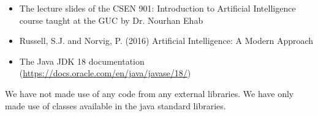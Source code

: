 \documentclass{article}
\begin{document}
\begin{itemize}

\item The lecture slides of the CSEN 901: Introduction to Artificial Intelligence course taught at the GUC by Dr. Nourhan Ehab
\item Russell, S.J. and Norvig, P. (2016) Artificial Intelligence: A Modern Approach
\item The Java JDK 18 documentation (\url{https://docs.oracle.com/en/java/javase/18/})
\end{itemize}

We have not made use of any code from any external libraries. We have only made use of classes available in the java standard libraries.
\end{document}

